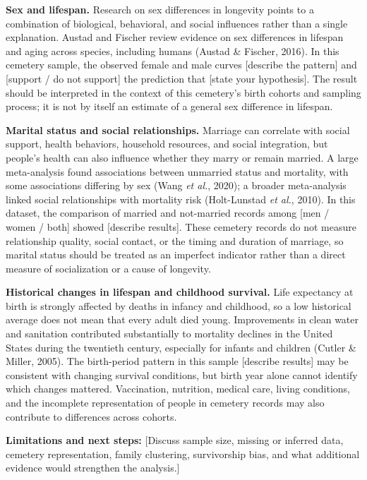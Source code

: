 \documentclass[
  10pt,
  twocolumn]{article}
\begin{document}
\textbf{Sex and lifespan.} Research on sex differences in longevity
points to a combination of biological, behavioral, and social influences
rather than a single explanation. Austad and Fischer review evidence on
sex differences in lifespan and aging across species, including humans
(Austad \& Fischer, 2016). In this cemetery sample, the observed female
and male curves {[}describe the pattern{]} and {[}support / do not
support{]} the prediction that {[}state your hypothesis{]}. The result
should be interpreted in the context of this cemetery's birth cohorts
and sampling process; it is not by itself an estimate of a general sex
difference in lifespan.

\textbf{Marital status and social relationships.} Marriage can correlate
with social support, health behaviors, household resources, and social
integration, but people's health can also influence whether they marry
or remain married. A large meta-analysis found associations between
unmarried status and mortality, with some associations differing by sex
(Wang \emph{et al.}, 2020); a broader meta-analysis linked social
relationships with mortality risk (Holt-Lunstad \emph{et al.}, 2010). In
this dataset, the comparison of married and not-married records among
{[}men / women / both{]} showed {[}describe results{]}. These cemetery
records do not measure relationship quality, social contact, or the
timing and duration of marriage, so marital status should be treated as
an imperfect indicator rather than a direct measure of socialization or
a cause of longevity.

\textbf{Historical changes in lifespan and childhood survival.} Life
expectancy at birth is strongly affected by deaths in infancy and
childhood, so a low historical average does not mean that every adult
died young. Improvements in clean water and sanitation contributed
substantially to mortality declines in the United States during the
twentieth century, especially for infants and children (Cutler \&
Miller, 2005). The birth-period pattern in this sample {[}describe
results{]} may be consistent with changing survival conditions, but
birth year alone cannot identify which changes mattered. Vaccination,
nutrition, medical care, living conditions, and the incomplete
representation of people in cemetery records may also contribute to
differences across cohorts.

\textbf{Limitations and next steps:} {[}Discuss sample size, missing or
inferred data, cemetery representation, family clustering, survivorship
bias, and what additional evidence would strengthen the analysis.{]}
\end{document}
